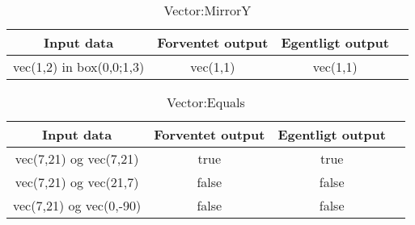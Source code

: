 \begin{table}[ht]
	\caption{Vector:MirrorY}
	\centering
	\begin{tabular}{c c c c}
		\hline\hline
		Input data & Forventet output & Egentligt output \\ [0.5ex]
		\hline
		vec(1,2) in box(0,0;1,3) & vec(1,1) & vec(1,1)\\
		\hline
	\end{tabular}
	\label{table:vectorMirrorY}
\end{table}

\begin{table}[ht]
	\caption{Vector:Equals}
	\centering
	\begin{tabular}{c c c c}
		\hline\hline
		Input data & Forventet output & Egentligt output \\ [0.5ex]
		\hline
		vec(7,21) og vec(7,21) & true & true\\
		vec(7,21) og vec(21,7) & false & false\\
		vec(7,21) og vec(0,-90) & false & false\\
		\hline
	\end{tabular}
	\label{table:vectorEquals}
\end{table}